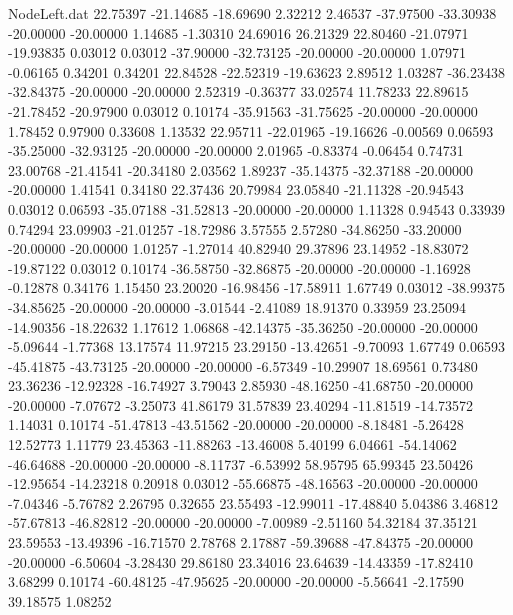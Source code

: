 \begin{filecontents}{NodeLeft.dat}
  22.75397  -21.14685  -18.69690     2.32212    2.46537  -37.97500  -33.30938  -20.00000  -20.00000    1.14685   -1.30310   24.69016   26.21329
  22.80460  -21.07971  -19.93835     0.03012    0.03012  -37.90000  -32.73125  -20.00000  -20.00000    1.07971   -0.06165    0.34201    0.34201
  22.84528  -22.52319  -19.63623     2.89512    1.03287  -36.23438  -32.84375  -20.00000  -20.00000    2.52319   -0.36377   33.02574   11.78233
  22.89615  -21.78452  -20.97900     0.03012    0.10174  -35.91563  -31.75625  -20.00000  -20.00000    1.78452    0.97900    0.33608    1.13532
  22.95711  -22.01965  -19.16626    -0.00569    0.06593  -35.25000  -32.93125  -20.00000  -20.00000    2.01965   -0.83374   -0.06454    0.74731
  23.00768  -21.41541  -20.34180     2.03562    1.89237  -35.14375  -32.37188  -20.00000  -20.00000    1.41541    0.34180   22.37436   20.79984
  23.05840  -21.11328  -20.94543     0.03012    0.06593  -35.07188  -31.52813  -20.00000  -20.00000    1.11328    0.94543    0.33939    0.74294
  23.09903  -21.01257  -18.72986     3.57555    2.57280  -34.86250  -33.20000  -20.00000  -20.00000    1.01257   -1.27014   40.82940   29.37896
  23.14952  -18.83072  -19.87122     0.03012    0.10174  -36.58750  -32.86875  -20.00000  -20.00000   -1.16928   -0.12878    0.34176    1.15450
  23.20020  -16.98456  -17.58911     1.67749    0.03012  -38.99375  -34.85625  -20.00000  -20.00000   -3.01544   -2.41089   18.91370    0.33959
  23.25094  -14.90356  -18.22632     1.17612    1.06868  -42.14375  -35.36250  -20.00000  -20.00000   -5.09644   -1.77368   13.17574   11.97215
  23.29150  -13.42651   -9.70093     1.67749    0.06593  -45.41875  -43.73125  -20.00000  -20.00000   -6.57349  -10.29907   18.69561    0.73480
  23.36236  -12.92328  -16.74927     3.79043    2.85930  -48.16250  -41.68750  -20.00000  -20.00000   -7.07672   -3.25073   41.86179   31.57839
  23.40294  -11.81519  -14.73572     1.14031    0.10174  -51.47813  -43.51562  -20.00000  -20.00000   -8.18481   -5.26428   12.52773    1.11779
  23.45363  -11.88263  -13.46008     5.40199    6.04661  -54.14062  -46.64688  -20.00000  -20.00000   -8.11737   -6.53992   58.95795   65.99345
  23.50426  -12.95654  -14.23218     0.20918    0.03012  -55.66875  -48.16563  -20.00000  -20.00000   -7.04346   -5.76782    2.26795    0.32655
  23.55493  -12.99011  -17.48840     5.04386    3.46812  -57.67813  -46.82812  -20.00000  -20.00000   -7.00989   -2.51160   54.32184   37.35121
  23.59553  -13.49396  -16.71570     2.78768    2.17887  -59.39688  -47.84375  -20.00000  -20.00000   -6.50604   -3.28430   29.86180   23.34016
  23.64639  -14.43359  -17.82410     3.68299    0.10174  -60.48125  -47.95625  -20.00000  -20.00000   -5.56641   -2.17590   39.18575    1.08252

\end{filecontents}
